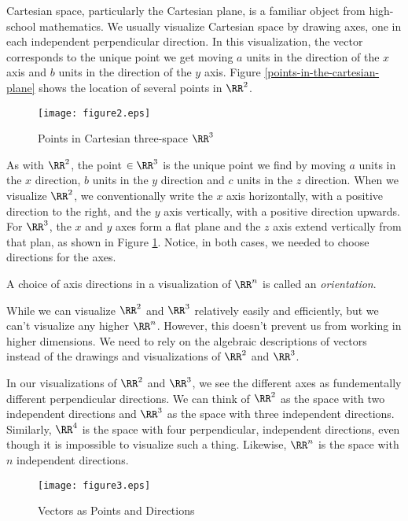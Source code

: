 \documentclass[fleqn]{report}
\begin{document}
Cartesian space, particularly the Cartesian plane, is a familiar
object from high-school mathematics. We usually visualize
Cartesian space by drawing axes, one in each
independent perpendicular direction. 
In this visualization, the vector
 corresponds to the
unique point we get moving $a$ units in the direction of the $x$
axis and $b$ units in the direction of the $y$ axis.
Figure \ref{points-in-the-cartesian-plane} shows the location
of several points in $\RR^2$.

\begin{figure}[t]
\centering
\texttt{[image: figure2.eps]}
\caption{Points in Cartesian three-space $\RR^3$}
\label{points-in-cartesian-three-space}
\end{figure}

As with $\RR^2$, the point
 $\in \RR^3$ is the
unique point we find by moving $a$ units in the $x$ direction,
$b$ units in the $y$ direction and $c$ units in the $z$
direction. When we visualize $\RR^2$, we conventionally write
the $x$ axis horizontally, with a positive direction to the
right, and the $y$ axis vertically, with a positive direction
upwards. For $\RR^3$, the $x$ and $y$ axes form a flat plane
and the $z$ axis extend vertically from that plan, as shown in
Figure \ref{points-in-cartesian-three-space}. Notice, in both
cases, we needed to choose directions for the axes.

\begin{defn}
A choice of axis directions in a visualization of $\RR^n$ 
is called an \emph{orientation}.
\end{defn}

While we can visualize $\RR^2$ and $\RR^3$ relatively easily and
efficiently, but we can't visualize any higher $\RR^n$. However,
this doesn't prevent us from working in higher dimensions. We need to
rely on the algebraic descriptions of vectors instead of the
drawings and visualizations of $\RR^2$ and $\RR^3$. 

In our visualizations of $\RR^2$ and
$\RR^3$, we see the different axes as fundementally
different perpendicular directions. We can think of $\RR^2$ as
the space with two independent directions and $\RR^3$ as the
space with three independent directions. Similarly, $\RR^4$ is
the space with four perpendicular, independent directions, even
though it is impossible to visualize such a thing. 
Likewise, $\RR^n$ is the space with $n$ independent directions. 

\begin{figure}[t]
\centering
\texttt{[image: figure3.eps]}
\caption{Vectors as Points and Directions}
\label{points-and-directions}
\end{figure}
\end{document}
